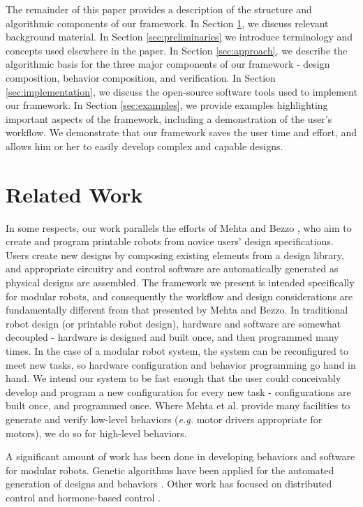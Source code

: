 \documentclass[graybox]{svmult}
\begin{document}
The remainder of this paper provides a  description of the
structure and algorithmic components of our framework.  In Section \ref{sec:related-work},
we discuss relevant background material.
In Section \ref{sec:preliminaries} we introduce terminology and  concepts used elsewhere in the
paper. 
In Section \ref{sec:approach}, we describe the algorithmic basis
for the three major components of our framework - design composition, behavior
composition, and verification.  In Section
\ref{sec:implementation}, we discuss the open-source software
tools used to implement our framework. In Section \ref{sec:examples}, we provide examples highlighting
important aspects of the framework, including a demonstration of the user's
workflow.  We demonstrate that our framework saves the
user time and effort, and allows him or her to easily develop complex and
capable designs.

\section{Related Work} \label{sec:related-work} 
In some respects, our work parallels the efforts of Mehta \cite{mehta2014design}
and Bezzo \cite{bezzo2014demo}, who aim to create and program printable robots
from novice users' design specifications.  Users create new designs by composing
existing elements from a design library, and appropriate circuitry and control
software are automatically generated as physical designs are assembled. The
framework we present is intended specifically for modular robots, and
consequently the workflow and design considerations are fundamentally different
from that presented by Mehta and Bezzo.  In traditional robot design (or
printable robot design), hardware and software are somewhat decoupled - hardware
is designed and built once, and then programmed many times.  In the case of a
modular robot system, the system can be reconfigured to meet new tasks, so
hardware configuration and behavior programming go hand in hand.  We intend our
system to be fast enough that the user could conceivably develop and program a
new configuration for every new task - configurations are built once, and programmed once.
Where Mehta et al. provide many facilities to generate and verify low-level
behaviors (\textit{e.g.} motor drivers appropriate for motors), we do so for
high-level behaviors.

A significant amount of work has been done in developing behaviors and software
for modular robots. Genetic algorithms
have been applied for the automated generation of designs and behaviors
\cite{hornby2003generative}. Other work has focused on distributed control
\cite{walter2002choosing} and hormone-based control \cite{salemi2001hormone}.
\end{document}
